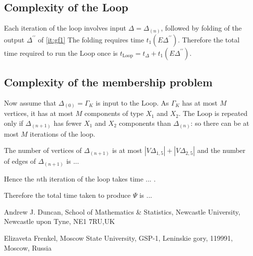 \documentclass[a4paper,12pt]{article}
\newcommand{\G}{\Gamma }
\newcommand{\D}{\Delta }
\numberwithin{equation}{section}
\numberwithin{figure}{section}
\newcommand{\Loop}{\operatorname{Loop}}
\begin{document}
\subsection{Complexity of the Loop}\label{sub:loop}
Each iteration of the loop involves input $\D=\D_{(n)}$, followed by
folding of the output $\D^{\prime\prime}$ of \ref{it:gf1}
The folding requires time $t_1(E\D^{\prime\prime})$. Therefore the
total time required to run the Loop once is
 $t_{\Loop}= t_{\D}+t_1(E\D^{\prime\prime})$.


\subsection{Complexity of the membership problem}\label{sub:mp_complexity}

Now assume that $\D_{(0)}=\G_K$ is input to the Loop. As $\G_K$ has at
most $M$ vertices, it has at most $M$  components of type $X_1$ and $X_2$.
 The Loop  is repeated
 only if $\D_{(n+1)}$ has fewer  $X_1$ and $X_2$ components
than $\D_{(n)}$: so there can be at most $M$ iterations of the loop.

The number of vertices of $\D_{(n+1)}$ is at most 
$|V\D_{1,5}|+|V\D_{2,5}|$ 
and the number of edges of     $\D_{(n+1)}$ is ...

Hence the $n$th iteration of the loop takes time ... .

Therefore the total time taken to produce $\Psi$ is ...





\medskip
\noindent\textsf{Andrew J. Duncan, School of Mathematics \&
Statistics, Newcastle University, Newcastle upon Tyne, NE1 7RU,UK}


\noindent \textsf{Elizaveta Frenkel, Moscow State University,
GSP-1, Leninskie gory, 119991, Moscow, Russia}

\end{document}
